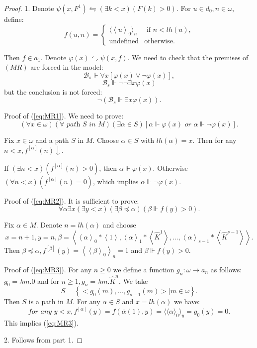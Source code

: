 \documentclass{asl}
\theoremstyle{definition}
\begin{document}
\begin{proof}
1. Denote $\psi(x,F^1)\leftrightharpoons (\exists k<x)(F(k)>0)$. For $u\in d_0, n\in \omega $, define:
\begin{displaymath}
f(u,n) =
\begin{cases}
\langle\left\langle u\right\rangle_0\rangle_n  & \text{ if } n<lh(u),\\
\text{undefined}& \text{otherwise}.
\end{cases}
\end{displaymath} 

Then $f\in a_1$. Denote $\varphi(x)\leftrightharpoons \psi(x,f)$. We need to check that the premises of $(MR)$ are forced in the model:
\begin{equation}
\mathcal{B}_s\Vdash \forall x\left[\varphi(x)\vee \neg \varphi(x) \right], 
\label{eq:MR1}
\end{equation}
\begin{equation}
\mathcal{B}_s\Vdash \neg\neg\exists x\varphi(x)
\label{eq:MR2}
\end{equation}
but the conclusion is not forced:
\begin{equation}
\neg\left( \mathcal{B}_s\Vdash \exists x\varphi(x)\right) . 
\label{eq:MR3}
\end{equation}

Proof of (\ref{eq:MR1}). We need to prove:
\[ (\forall x\in \omega)(\forall \textit{ path } S\textit{ in }M) (\exists\alpha \in S)\left[\alpha\Vdash\varphi(x) \textit{  or  }\alpha\Vdash\neg\varphi(x)\right].\]

Fix $x\in \omega$ and a path $S$ in $M$. Choose $\alpha\in S$ with $lh(\alpha)=x$. Then for any $n<x, f^{[\alpha]}(n)\downarrow$.

If $(\exists n<x)\left( f^{[\alpha]}(n)>0\right) $, then $\alpha\Vdash\varphi(x)$. Otherwise $(\forall n<x)\left(f^{[\alpha]}(n)=0\right)$, which implies $\alpha\Vdash \neg\varphi(x)$.

Proof of (\ref{eq:MR2}).
It is sufficient to prove:
\[\forall \alpha\exists x(\exists y<x)(\exists \beta\preccurlyeq \alpha)\left( \beta\Vdash f(y)>0\right) .\]

Fix $\alpha\in M$. Denote $n=lh(\alpha)$ and choose 
\[ x=n+1, y=n, \beta=\left\langle
\left\langle \alpha\right\rangle_0*\left\langle 1\right\rangle,
\left\langle \alpha\right\rangle_1*\left\langle \widehat{K}^1\right\rangle,\ldots,
\left\langle \alpha\right\rangle_{s-1}*\left\langle \widehat{K}^{s-1}\right\rangle\right\rangle.\]
Then $\beta\preceq\alpha, f^{[\beta]}(y)=\left\langle\left\langle\beta\right\rangle_0\right\rangle_n=1$ and $\beta\Vdash f(y)>0$.

Proof of (\ref{eq:MR3}).
For any $n\geqslant 0$ we define a function $g_n:\omega \rightarrow a_n$ as follows:
$g_0=\lambda m.0$ and for $n\geqslant 1, g_n=\lambda m.\widehat{K}^{n}$. We take 
\[S=\left\lbrace <\bar{g}_0(m),\ldots,\bar{g}_{s-1}(m)>|m\in \omega\right\rbrace.\]
Then $S$ is a path in $M$. For any $\alpha\in S$ and $x=lh(\alpha)$ we have: 
\[\textit{for any } y<x, f^{[\alpha]}(y)=f(\bar{\alpha}(1),y)=\langle \langle\alpha\rangle_0\rangle_y=g_0(y)=0.\]
This implies (\ref{eq:MR3}).
 
2. Follows from part 1. 
\end{proof}
\end{document}
